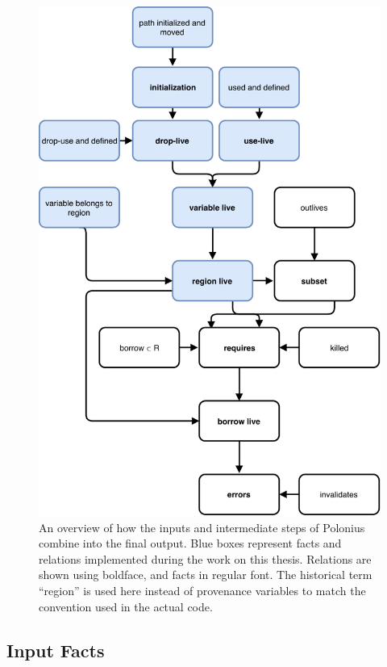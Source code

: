 \documentclass[11pt,a4paper,twoside,openany,draft]{report}
\begin{document}
\begin{figure}
  \includegraphics[width=0.9\linewidth]{Graphs/polonius-overview}
  \caption[Flowchart of the Polonius Inputs and Outputs]{An overview of how the
    inputs and intermediate steps of Polonius combine into the final output.
    Blue boxes represent facts and relations implemented during the work on this
    thesis. Relations are shown using boldface, and facts in regular font. The
    historical term ``region'' is used here instead of provenance variables to
    match the convention used in the actual code.}
  \label{fig:polonius-overview}
\end{figure}

\subsection{Input Facts}
\label{sec:input-facts}
\end{document}
